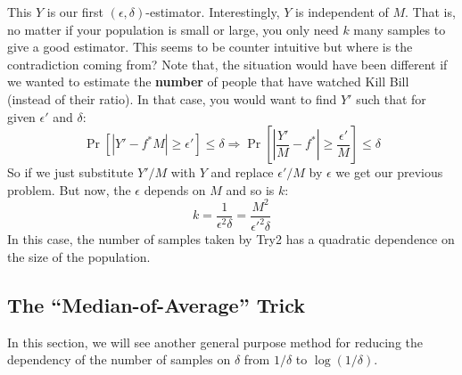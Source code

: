 \documentclass[11pt]{article}
\begin{document}
This $Y$ is our first $(\epsilon,\delta)$-estimator. Interestingly, $Y$ is independent of $M$. That is, no matter if your population is small or large, you only need $k$ many samples to give a good estimator. This seems to be counter intuitive but where is the contradiction coming from? Note that, the situation would have been different if we wanted to estimate the \textbf{number} of people that have watched Kill Bill (instead of their ratio). In that case, you would want to find $Y'$ such that for given $\epsilon'$ and $\delta$:
\begin{equation*}
    \Pr[|Y'-f^*M| \geq \epsilon'] \leq \delta \Rightarrow \Pr[|\frac{Y'}{M}-f^*| \geq \frac{\epsilon'}{M}] \leq \delta
\end{equation*}
So if we just substitute $Y'/M$ with $Y$ and replace $\epsilon'/M$ by $\epsilon$ we get our previous problem. But now, the $\epsilon$ depends on $M$ and so is $k$:
\begin{equation*}
    k = \frac{1}{\epsilon^2\delta} = \frac{M^2}{\epsilon'^2\delta}
\end{equation*}
In this case, the number of samples taken by Try2 has a quadratic dependence on the size of the population.
\subsection{The ``Median-of-Average'' Trick}
In this section, we will see another general purpose method for reducing the dependency of the number of samples on $\delta$ from $1/\delta$ to $\log{(1/\delta)}$.
\end{document}
